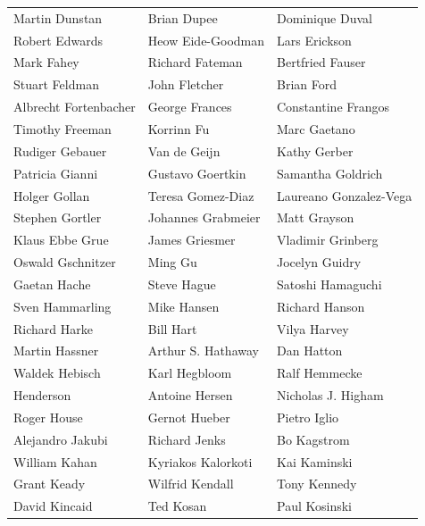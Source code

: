 \begin{tabular}{lll}
Martin Dunstan         & Brian Dupee            & Dominique Duval\\
Robert Edwards         & Heow Eide-Goodman      & Lars Erickson\\
Mark Fahey             & Richard Fateman        & Bertfried Fauser\\
Stuart Feldman         & John Fletcher          & Brian Ford\\
Albrecht Fortenbacher  & George Frances         & Constantine Frangos\\
Timothy Freeman        & Korrinn Fu             & Marc Gaetano\\
Rudiger Gebauer        & Van de Geijn           & Kathy Gerber\\
Patricia Gianni        & Gustavo Goertkin       & Samantha Goldrich\\
Holger Gollan          & Teresa Gomez-Diaz      & Laureano Gonzalez-Vega\\
Stephen Gortler        & Johannes Grabmeier     & Matt Grayson\\
Klaus Ebbe Grue        & James Griesmer         & Vladimir Grinberg\\
Oswald Gschnitzer      & Ming Gu                & Jocelyn Guidry\\
Gaetan Hache           & Steve Hague            & Satoshi Hamaguchi\\
Sven Hammarling        & Mike Hansen            & Richard Hanson\\
Richard Harke          & Bill Hart              & Vilya Harvey\\
Martin Hassner         & Arthur S. Hathaway     & Dan Hatton\\
Waldek Hebisch         & Karl Hegbloom          & Ralf Hemmecke\\
Henderson              & Antoine Hersen         & Nicholas J. Higham\\
Roger House            & Gernot Hueber          & Pietro Iglio\\
Alejandro Jakubi       & Richard Jenks          & Bo Kagstrom\\
William Kahan          & Kyriakos Kalorkoti     & Kai Kaminski\\
Grant Keady            & Wilfrid Kendall        & Tony Kennedy\\
David Kincaid          & Ted Kosan              & Paul Kosinski\\

\end{tabular}
\vfill
\newpage
